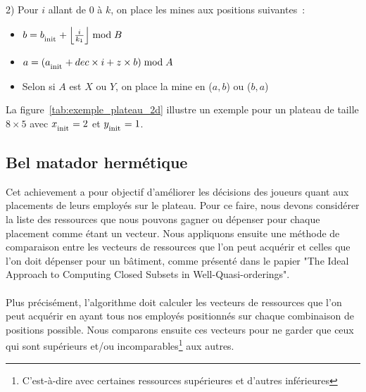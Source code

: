2) Pour \(i\) allant de \(0\) à \(k\), on place les mines aux positions suivantes~:
\begin{itemize}
    \item \(b = b_{\textsubscript{init}} + \left\lfloor \frac{i}{k_1} \right\rfloor \bmod B \)
    \item  \(a =  (a_{\textsubscript{init}} + dec \times i + z \times b)\bmod A\)
    \item Selon si \(A\) est \(X\) ou \(Y\), on place la mine en (\(a, b\)) ou (\(b, a\))
\end{itemize}
La figure~\ref{tab:exemple_plateau_2d} illustre un exemple pour un plateau de taille \(8 \times 5\) avec \(x_{\textsubscript{init}} = 2\) et \(y_{\textsubscript{init}} = 1\).
\begin{center}
    \label{tab:exemple_plateau_2d}
\end{center}
\vspace{0.5cm}

\subsection*{Bel matador hermétique}
\label{sec:bmh}
Cet achievement a pour objectif d'améliorer les décisions des joueurs quant aux placements de leurs employés sur le plateau. Pour ce faire, nous devons considérer la liste des ressources que nous pouvons gagner ou dépenser pour chaque placement comme étant un vecteur. Nous appliquons ensuite une méthode de comparaison entre les vecteurs de ressources que l'on peut acquérir et celles que l'on doit dépenser pour un bâtiment, comme présenté dans le papier "The Ideal Approach to Computing Closed Subsets in Well-Quasi-orderings"\cite{goubault2020ideal}. \\ \\
Plus précisément, l'algorithme doit calculer les vecteurs de ressources que l'on peut acquérir en ayant tous nos employés positionnés sur chaque combinaison de positions possible. Nous comparons ensuite ces vecteurs pour ne garder que ceux qui sont supérieurs et/ou incomparables\footnote{C'est-à-dire avec certaines ressources supérieures et d'autres inférieures} aux autres.

